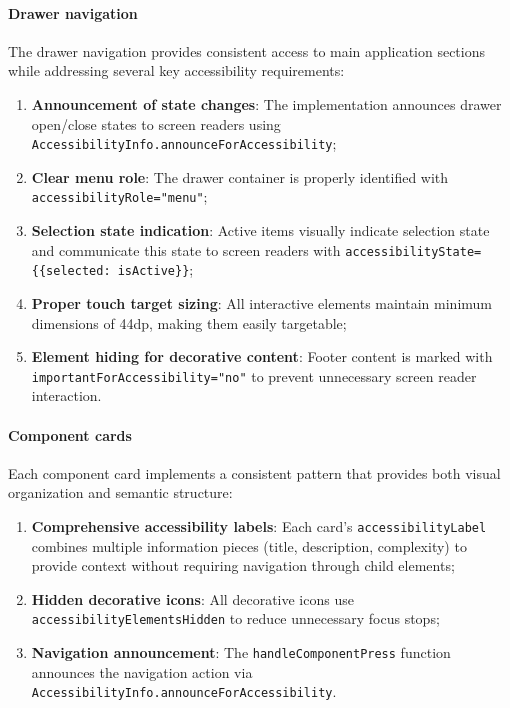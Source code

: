 \FloatBarrier

\paragraph{Drawer navigation}

The drawer navigation provides consistent access to main application sections while addressing several key accessibility requirements:

\begin{enumerate}
    \item \textbf{Announcement of state changes}: The implementation announces drawer open/close states to screen readers using \texttt{AccessibilityInfo.announceForAccessibility};
    
    \item \textbf{Clear menu role}: The drawer container is properly identified with \\ \texttt{accessibilityRole="menu"};
    
    \item \textbf{Selection state indication}: Active items visually indicate selection state and communicate this state to screen readers with \texttt{accessibilityState=\{\{selected: isActive\}\}};
    
    \item \textbf{Proper touch target sizing}: All interactive elements maintain minimum dimensions of 44dp, making them easily targetable;
    
    \item \textbf{Element hiding for decorative content}: Footer content is marked with \\ \texttt{importantForAccessibility="no"} to prevent unnecessary screen reader interaction.
\end{enumerate}

\FloatBarrier

\paragraph{Component cards}

Each component card implements a consistent pattern that provides both visual organization and semantic structure:

\begin{enumerate}
    \item \textbf{Comprehensive accessibility labels}: Each card's \texttt{accessibilityLabel} combines multiple information pieces (title, description, complexity) to provide context without requiring navigation through child elements;
    
    \item \textbf{Hidden decorative icons}: All decorative icons use \texttt{accessibilityElementsHidden} to reduce unnecessary focus stops;
    
    \item \textbf{Navigation announcement}: The \texttt{handleComponentPress} function announces the navigation action via \texttt{AccessibilityInfo.announceForAccessibility}.
\end{enumerate}

